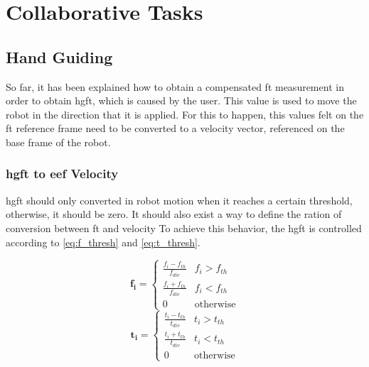 \chapter{Collaborative Tasks}
\label{chp:5-tasks}







\section{Hand Guiding}

\par So far, it has been explained how to obtain a compensated \ac{ft} measurement in order to obtain \acf{hgft}, which is caused by the user. This value is used to move the robot in the direction that it is applied. For this to happen, this values felt on the \ac{ft} reference frame need to be converted to a velocity vector, referenced on the base frame of the robot. 



\subsection{\ac{hgft} to \ac{eef} Velocity}
\label{ssec:ft_to_eef}

\par \ac{hgft} should only converted in robot motion when it reaches a certain threshold, otherwise, it should be zero. It should also exist a way to define the ration of conversion between \ac{ft} and velocity To achieve this behavior, the \ac{hgft} is controlled according to \autoref{eq:f_thresh} and \autoref{eq:t_thresh}.

\begin{multicols}{2}
    \begin{equation}
        \mathbf{f_i} =
        \begin{cases}
          \frac{f_i - f_{th}}{f_{div}} & f_i > f_{th}\\
          \frac{f_i + f_{th}}{f_{div}} & f_i < f_{th}\\
          0 & \text{otherwise}
        \end{cases}
        \label{eq:f_thresh}
    \end{equation}\break
    \begin{equation}
        \mathbf{t_i} =
        \begin{cases}
          \frac{t_i - t_{th}}{t_{div}} & t_i > t_{th}\\
          \frac{t_i + t_{th}}{t_{div}} & t_i < t_{th}\\
          0 & \text{otherwise}
        \end{cases}
        \label{eq:t_thresh} 
    \end{equation}
\end{multicols}

